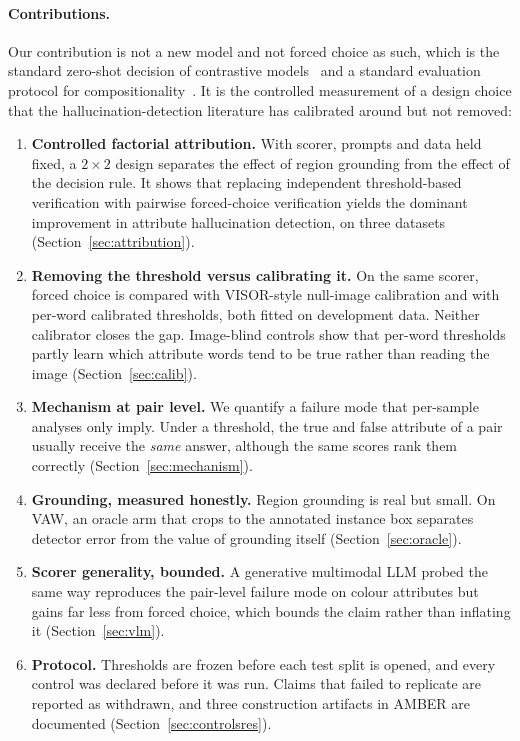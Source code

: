\documentclass[11pt]{article}
\begin{document}
\paragraph{Contributions.} Our contribution is not a new model and not forced choice as such, which is the standard zero-shot decision of contrastive models~\cite{radford2021clip} and a standard evaluation protocol for compositionality~\cite{yuksekgonul2023bow,thrush2022winoground,hsieh2023sugarcrepe}. It is the controlled measurement of a design choice that the hallucination-detection literature has calibrated around but not removed:
\begin{enumerate}[leftmargin=*]
\item \textbf{Controlled factorial attribution.} With scorer, prompts and data held fixed, a $2\times2$ design separates the effect of region grounding from the effect of the decision rule. It shows that replacing independent threshold-based verification with pairwise forced-choice verification yields the dominant improvement in attribute hallucination detection, on three datasets (Section~\ref{sec:attribution}).
\item \textbf{Removing the threshold versus calibrating it.} On the same scorer, forced choice is compared with VISOR-style null-image calibration and with per-word calibrated thresholds, both fitted on development data. Neither calibrator closes the gap. Image-blind controls show that per-word thresholds partly learn which attribute words tend to be true rather than reading the image (Section~\ref{sec:calib}).
\item \textbf{Mechanism at pair level.} We quantify a failure mode that per-sample analyses only imply. Under a threshold, the true and false attribute of a pair usually receive the \emph{same} answer, although the same scores rank them correctly (Section~\ref{sec:mechanism}).
\item \textbf{Grounding, measured honestly.} Region grounding is real but small. On VAW, an oracle arm that crops to the annotated instance box separates detector error from the value of grounding itself (Section~\ref{sec:oracle}).
\item \textbf{Scorer generality, bounded.} A generative multimodal LLM probed the same way reproduces the pair-level failure mode on colour attributes but gains far less from forced choice, which bounds the claim rather than inflating it (Section~\ref{sec:vlm}).
\item \textbf{Protocol.} Thresholds are frozen before each test split is opened, and every control was declared before it was run. Claims that failed to replicate are reported as withdrawn, and three construction artifacts in AMBER are documented (Section~\ref{sec:controlsres}).
\end{enumerate}
\end{document}
